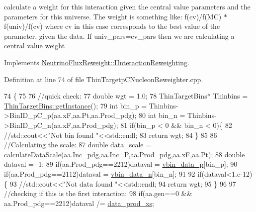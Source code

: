 calculate a weight for this interaction given the central value parameters and the parameters for this universe. The weight is something like\-: f(cv)/f(M\-C) $\ast$ f(univ)/f(cv) where cv in this case corresponds to the best value of the parameter, given the data. If univ\-\_\-pars=cv\-\_\-pars then we are calculating a central value weight 



Implements \hyperlink{class_neutrino_flux_reweight_1_1_i_interaction_reweighting_a49b0d73e778411d629205d23575703c3}{Neutrino\-Flux\-Reweight\-::\-I\-Interaction\-Reweighting}.



Definition at line 74 of file Thin\-Targetp\-C\-Nucleon\-Reweighter.\-cpp.


\begin{DoxyCode}
74                                                                                 \{
75  
76     \textcolor{comment}{//quick check:}
77     \textcolor{keywordtype}{double} wgt = 1.0;
78     ThinTargetBins*  Thinbins =  \hyperlink{class_neutrino_flux_reweight_1_1_thin_target_bins_aeff5cf7220dd08322f5abac2cbc7ff33}{ThinTargetBins::getInstance}();
79     \textcolor{keywordtype}{int} bin\_p = Thinbins->BinID\_pC\_p(aa.xF,aa.Pt,aa.Prod\_pdg);
80     \textcolor{keywordtype}{int} bin\_n = Thinbins->BinID\_pC\_n(aa.xF,aa.Prod\_pdg);
81     \textcolor{keywordflow}{if}(bin\_p < 0 && bin\_n < 0)\{
82       \textcolor{comment}{//std::cout<<"Not bin found "<<std::endl;}
83       \textcolor{keywordflow}{return} wgt;
84     \}
85 
86     \textcolor{comment}{//Calculating the scale:}
87     \textcolor{keywordtype}{double} data\_scale = \hyperlink{class_neutrino_flux_reweight_1_1_thin_targetp_c_nucleon_reweighter_a639fe43b3b14e2f1fd277dbbab71cae1}{calculateDataScale}(aa.Inc\_pdg,aa.Inc\_P,aa.Prod\_pdg,aa.xF,aa.Pt);
88     \textcolor{keywordtype}{double} dataval = -1;
89     \textcolor{keywordflow}{if}(aa.Prod\_pdg==2212)dataval = \hyperlink{class_neutrino_flux_reweight_1_1_thin_targetp_c_nucleon_reweighter_affc490a2bc6f148c1eab12f3cba2457d}{vbin\_data\_p}[bin\_p];
90     \textcolor{keywordflow}{if}(aa.Prod\_pdg==2112)dataval = \hyperlink{class_neutrino_flux_reweight_1_1_thin_targetp_c_nucleon_reweighter_a3ad5552b4cf05ff2f81a93f3d13432ad}{vbin\_data\_n}[bin\_n];
91     
92     \textcolor{keywordflow}{if}(dataval<1.e-12)\{
93       \textcolor{comment}{//std::cout<<"Not data found "<<std::endl;}
94       \textcolor{keywordflow}{return} wgt;
95     \}
96 
97     \textcolor{comment}{//checking if this is the first interaction:}
98     \textcolor{keywordflow}{if}(aa.gen==0 && aa.Prod\_pdg==2212)dataval /= \hyperlink{class_neutrino_flux_reweight_1_1_thin_targetp_c_nucleon_reweighter_a42193d9c122fad580b96311a7b5e13fb}{data\_prod\_xs};

\end{DoxyCode}
